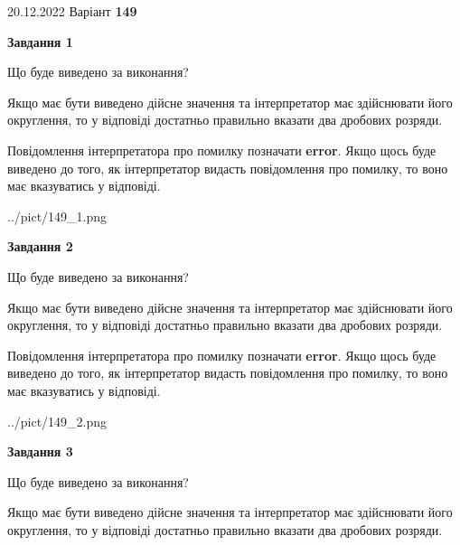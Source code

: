 \documentclass[12pt, ukrainian]{article}
\begin{document}
{20.12.2022 Варіант \No \textbf { 149 }\par}
{
\begin {Large}

{\begin {center}\textbf{Завдання 1}\end {center}}\par
Що буде виведено за виконання? \par

Якщо має бути виведено дійсне значення та інтерпретатор має здійснювати його округлення, 
то у відповіді достатньо правильно вказати два дробових розряди.

Повідомлення інтерпретатора про помилку позначати \textbf{error}.
Якщо щось буде виведено до того, як інтерпретатор видасть повідомлення про помилку, 
то воно має вказуватись у відповіді. \par

\begin{center}
	{../pict/149_1.png}
\end{center}
\newpage

{\begin {center}\textbf{Завдання 2}\end {center}}\par
Що буде виведено за виконання? \par

Якщо має бути виведено дійсне значення та інтерпретатор має здійснювати його округлення, 
то у відповіді достатньо правильно вказати два дробових розряди.

Повідомлення інтерпретатора про помилку позначати \textbf{error}.
Якщо щось буде виведено до того, як інтерпретатор видасть повідомлення про помилку, 
то воно має вказуватись у відповіді. \par

\begin{center}
	{../pict/149_2.png}
\end{center}
\newpage

{\begin {center}\textbf{Завдання 3}\end {center}}\par
Що буде виведено за виконання? \par

Якщо має бути виведено дійсне значення та інтерпретатор має здійснювати його округлення, 
то у відповіді достатньо правильно вказати два дробових розряди.


\end{Large}}
\end{document}
